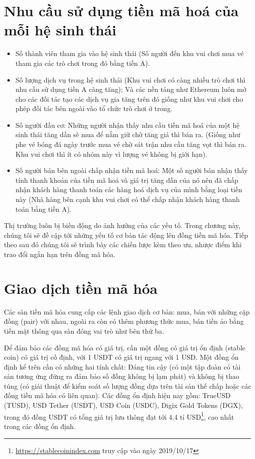\section{Nhu cầu sử dụng tiền mã hoá của mỗi hệ sinh thái}
\begin{itemize}
	\item Số thành viên tham gia vào hệ sinh thái (Số người đến khu vui chơi mua vé tham gia các trò chơi trong đó bằng tiền A).
	\item Số lượng dịch vụ trong hệ sinh thái (Khu vui chơi có càng nhiều trò chơi thì nhu cầu sử dụng tiền A càng tăng); Và các nền tảng như Ethereum luôn mở cho các đối tác tạo các dịch vụ gia tăng trên đó giống như khu vui chơi cho phép đối tác bên ngoài vào tổ chức trò chơi ở trong.
	\item  Số người đầu cơ: Những người nhận thấy nhu cầu tiền mã hoá của một hệ sinh thái tăng dần sẽ mua để nắm giữ chờ tăng giá thì bán ra. (Giống như phe vé bóng đá ngày trước mua vé chờ sát trận nhu cầu tăng vọt thì bán ra. Khu vui chơi thì ít có nhóm này vì lượng vé không bị giới hạn).
	\item  Số người bán bên ngoài chấp nhận tiền mã hoá: Một số người bán nhận thấy tính thanh khoản của tiền mã hoá và giá trị tăng dần của nó nên đã chấp nhận khách hàng thanh toán các hàng hoá dịch vụ của mình bằng loại tiền này (Nhà hàng bên cạnh khu vui chơi có thể chấp nhận khách hàng thanh toán bằng tiền A).
\end{itemize}

Thị trường luôn bị biến động do ảnh hưởng của các yếu tố. Trong chương này, chúng tôi sẽ đề cập tới những yếu tố cơ bản tác động lên đồng tiền mã hóa. Tiếp theo sau đó chúng tôi sẽ trình bày các chiến lược kèm theo ưu, nhược điểm khi trao đổi ngắn hạn trên đồng mã hóa.


\section{Giao dịch tiền mã hóa}
Các sàn tiền mã hóa cung cấp các lệnh giao dịch cơ bản: mua, bán với những cặp đồng (pair) với nhau, ngoài ra còn có thêm phương thức mua, bán tiền ảo bằng tiền mặt thông qua sàn đóng vai trò như bên thứ ba.\par
Để đảm bảo các đồng mã hóa có giá trị, cần một đồng có giá trị ổn định (stable coin) có giá trị cố định, với 1 USDT có giá trị ngang với 1 USD. Một đồng ổn định kể trên cần có những hai tính chất: Đáng tin cậy (có một tập đoàn có tài sản tương ứng đứng ra đảm bảo số đồng không bị lạm phát) và không bị thao túng (có giải thuật để kiểm soát số lượng đồng dựa trên tài sản thế chấp hoặc các đồng tiền mã hóa có liên quan). Các đồng ổn định hiện nay gồm:
TrueUSD (TUSD), USD Tether (USDT), USD Coin (USDC), Digix Gold Tokens (DGX), trong đó đồng USDT có tổng giá trị lưu thông đạt tới 4.4 tỉ USD\footnote{\url{https://stablecoinindex.com} truy cập vào ngày 2019/10/17}, cao nhất trong các đồng ổn định.

